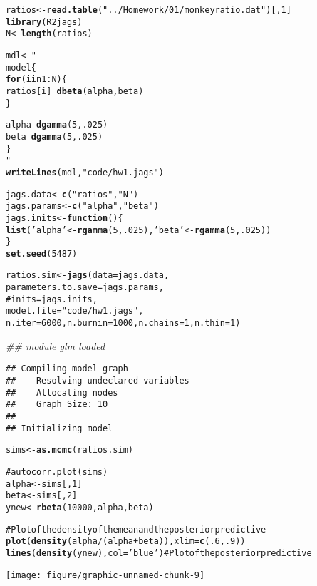 \documentclass[12pt,letterpaper,oneside]{article}\usepackage{graphicx, color}
\makeatletter
\newcommand{\hlfunctioncall}[1]{\textcolor[rgb]{0.501960784313725,0,0.329411764705882}{\textbf{#1}}}%
\newcommand{\hlstring}[1]{\textcolor[rgb]{0.6,0.6,1}{#1}}%
\newcommand{\hlcomment}[1]{\textcolor[rgb]{0.180392156862745,0.6,0.341176470588235}{#1}}%
\newenvironment{kframe}{%
 \def\at@end@of@kframe{}%
 \ifinner\ifhmode%
  \def\at@end@of@kframe{\end{minipage}}%
  \begin{minipage}{\columnwidth}%
 \fi\fi%
 \def\FrameCommand##1{\hskip\@totalleftmargin \hskip-\fboxsep
 \colorbox{shadecolor}{##1}\hskip-\fboxsep
     \hskip-\linewidth \hskip-\@totalleftmargin \hskip\columnwidth}%
 \MakeFramed {\advance\hsize-\width
   \@totalleftmargin\z@ \linewidth\hsize
   \@setminipage}}%
 {\par\unskip\endMakeFramed%
 \at@end@of@kframe}
\newenvironment{knitrout}{}{} %
\makeatother
\begin{document}
\begin{knitrout}\scriptsize
{}\color{fgcolor}\begin{kframe}
\begin{alltt}
ratios <- \hlfunctioncall{read.table}(\hlstring{"../Homework/01/monkeyratio.dat"})[,1]
\hlfunctioncall{library}(R2jags)
N <- \hlfunctioncall{length}(ratios)

mdl <- "
    model \{
        \hlfunctioncall{for} (i in 1:N) \{
            ratios[i] ~ \hlfunctioncall{dbeta}(alpha, beta)
        \}

        alpha ~ \hlfunctioncall{dgamma}(5, .025)
        beta ~ \hlfunctioncall{dgamma}(5, .025)
    \}
"
\hlfunctioncall{writeLines}(mdl, \hlstring{"code/hw1.jags"})

jags.data <- \hlfunctioncall{c}(\hlstring{"ratios"}, \hlstring{"N"})
jags.params <- \hlfunctioncall{c}(\hlstring{"alpha"}, \hlstring{"beta"})
jags.inits <- \hlfunctioncall{function}() \{
    \hlfunctioncall{list}(\hlstring{'alpha'} <- \hlfunctioncall{rgamma}(5,.025), \hlstring{'beta'} <- \hlfunctioncall{rgamma}(5,.025))
\}
\hlfunctioncall{set.seed}(5487)

ratios.sim <- \hlfunctioncall{jags}(data=jags.data,
                   parameters.to.save=jags.params,
\hlcomment{                   # inits=jags.inits,}
                   model.file=\hlstring{"code/hw1.jags"},
                   n.iter=6000, n.burnin=1000, n.chains=1, n.thin=1)
\end{alltt}


{\ttfamily\noindent\itshape\textcolor{messagecolor}{\#\# module glm loaded}}\begin{verbatim}
## Compiling model graph
##    Resolving undeclared variables
##    Allocating nodes
##    Graph Size: 10
## 
## Initializing model
\end{verbatim}
\begin{alltt}

sims <- \hlfunctioncall{as.mcmc}(ratios.sim)

\hlcomment{# autocorr.plot(sims)}
alpha <- sims[,1]
beta <- sims[,2]
ynew <- \hlfunctioncall{rbeta}(10000,alpha,beta)

\hlcomment{# Plot of the density of the mean and the posterior predictive}
\hlfunctioncall{plot}(\hlfunctioncall{density}(alpha/(alpha+beta)), xlim=\hlfunctioncall{c}(.6,.9))
\hlfunctioncall{lines}(\hlfunctioncall{density}(ynew), col=\hlstring{'blue'}) \hlcomment{# Plot of the posterior predictive}
\end{alltt}
\end{kframe}

{\centering \texttt{[image: figure/graphic-unnamed-chunk-9]} 

}



\end{knitrout}
\end{document}

